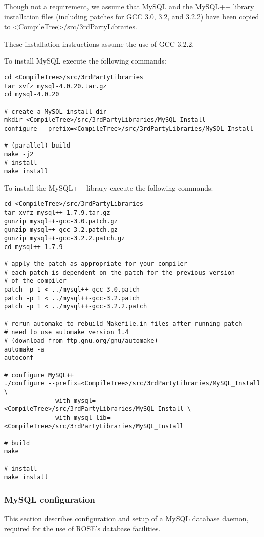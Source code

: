 \documentclass[times, 10pt]{book}
\begin{document}
Though not a requirement, we assume that MySQL and the MySQL++ library
installation files (including patches for GCC 3.0, 3.2, and 3.2.2) have been
copied to \textless{}CompileTree\textgreater{}/src/3rdPartyLibraries.  

These installation instructions assume the use of GCC 3.2.2.

To install MySQL execute the following commands:

\begin{verbatim}
cd <CompileTree>/src/3rdPartyLibraries
tar xvfz mysql-4.0.20.tar.gz
cd mysql-4.0.20

# create a MySQL install dir
mkdir <CompileTree>/src/3rdPartyLibraries/MySQL_Install
configure --prefix=<CompileTree>/src/3rdPartyLibraries/MySQL_Install

# (parallel) build
make -j2
# install
make install
\end{verbatim}

To install the MySQL++ library execute the following commands:

\begin{verbatim}
cd <CompileTree>/src/3rdPartyLibraries
tar xvfz mysql++-1.7.9.tar.gz
gunzip mysql++-gcc-3.0.patch.gz
gunzip mysql++-gcc-3.2.patch.gz
gunzip mysql++-gcc-3.2.2.patch.gz
cd mysql++-1.7.9

# apply the patch as appropriate for your compiler
# each patch is dependent on the patch for the previous version 
# of the compiler
patch -p 1 < ../mysql++-gcc-3.0.patch
patch -p 1 < ../mysql++-gcc-3.2.patch
patch -p 1 < ../mysql++-gcc-3.2.2.patch

# rerun automake to rebuild Makefile.in files after running patch
# need to use automake version 1.4 
# (download from ftp.gnu.org/gnu/automake)
automake -a
autoconf

# configure MySQL++
./configure --prefix=<CompileTree>/src/3rdPartyLibraries/MySQL_Install \
            --with-mysql=<CompileTree>/src/3rdPartyLibraries/MySQL_Install \
            --with-mysql-lib=<CompileTree>/src/3rdPartyLibraries/MySQL_Install

# build
make

# install
make install
\end{verbatim}

\subsubsection{MySQL configuration}

This section describes configuration and setup of a MySQL database daemon,
required for the use of ROSE's database facilities.
\end{document}
